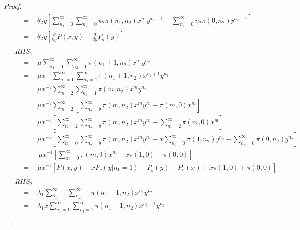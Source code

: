 \begin{proof}
\begin{align}
\begin{split}
            & \quad = \quad \theta_2 y \left[
                \sum_{n_1=0}^{\infty} \sum_{n_2=0}^{\infty} n_2 \pi(n_1,n_2) x^{n_1} y^{n_2-1}
                - \sum_{n_2=0}^{\infty} n_2 \pi(0,n_2) y^{n_2-1}
            \right] \\
            & \quad = \quad \theta_2 y \left[
                \frac{\partial}{\partial y} P(x,y) - \frac{d}{dy} P_y(y)
            \right]
        \end{split} \\
        \begin{split}
            & RHS_1 \\
            & \quad = \quad \mu \sum_{n_1=1}^{\infty} \sum_{n_2=1}^{\infty} \pi(n_1+1, n_2) x^{n_1} y^{n_2} \\
            & \quad = \quad \mu x^{-1} \sum_{n_1=1}^{\infty} \sum_{n_2=1}^{\infty} \pi(n_1+1, n_2) x^{n_1+1} y^{n_2} \\
            & \quad = \quad \mu x^{-1} \sum_{m=2}^{\infty} \sum_{n_2=1}^{\infty} \pi(m, n_2) x^{m} y^{n_2} \\
            & \quad = \quad \mu x^{-1} \sum_{m=2}^{\infty} \left[
                \sum_{n_2=0}^{\infty} \pi(m, n_2) x^{m} y^{n_2} - \pi(m, 0) x^m
            \right] \\
            & \quad = \quad \mu x^{-1} \left[ \sum_{m=2}^{\infty} \sum_{n_2=0}^{\infty} \pi(m, n_2) x^{m} y^{n_2}
                - \sum_{m=2}^{\infty} \pi(m, 0) x^{m}
            \right] \\
            & \quad = \quad \mu x^{-1} \left[
                \sum_{m=0}^{\infty} \sum_{n_2=0}^{\infty} \pi(m, n_2) x^{m} y^{n_2}
                - x \sum_{n_2=0}^{\infty} \pi(1, n_2) y^{n_2}
                - \sum_{n_2=0}^{\infty} \pi(0, n_2) y^{n_2}
            \right] \\
            & \quad \quad - \; \mu x^{-1} \left[
                \sum_{m=0}^{\infty} \pi(m, 0) x^{m} - x \pi(1, 0) - \pi(0, 0)
            \right] \\
            & \quad = \quad \mu x^{-1} \left[
                P(x,y) - x P_y(y | n_1=1) - P_y(y) - P_x(x) + x \pi(1, 0) + \pi(0, 0)
            \right]
        \end{split} \\
        \begin{split}
            & RHS_2 \\
            & \quad = \quad \lambda_1 \sum_{n_1=1}^{\infty} \sum_{n_2=1}^{\infty} \pi(n_1-1, n_2) x^{n_1} y^{n_2} \\
            & \quad = \quad \lambda_1 x \sum_{n_1=1}^{\infty} \sum_{n_2=1}^{\infty} \pi(n_1-1, n_2) x^{n_1-1} y^{n_2} \\

\end{split}
\end{align}
\end{proof}
